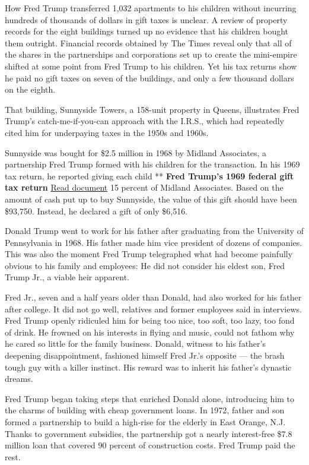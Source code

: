 How Fred Trump transferred 1,032 apartments to his children without
incurring hundreds of thousands of dollars in gift taxes is unclear. A
review of property records for the eight buildings turned up no evidence
that his children bought them outright. Financial records obtained by
The Times reveal only that all of the shares in the partnerships and
corporations set up to create the mini-empire shifted at some point from
Fred Trump to his children. Yet his tax returns show he paid no gift
taxes on seven of the buildings, and only a few thousand dollars on the
eighth.

That building, Sunnyside Towers, a 158-unit property in Queens,
illustrates Fred Trump's catch-me-if-you-can approach with the I.R.S.,
which had repeatedly cited him for underpaying taxes in the 1950s and
1960s.

Sunnyside was bought for \$2.5 million in 1968 by Midland Associates, a
partnership Fred Trump formed with his children for the transaction. In
his 1969 tax return, he reported giving each child ** \textbf{Fred
Trump's 1969 federal gift tax return}
\href{https://int.graylady3jvrrxbe.onion/data/documenthelper/210-fct-1969-federal-gift-tax/37760d2a7b28b983e8ce/optimized/full.pdf\#page=1}{Read
document} 15 percent of Midland Associates. Based on the amount of cash
put up to buy Sunnyside, the value of this gift should have been
\$93,750. Instead, he declared a gift of only \$6,516.

Donald Trump went to work for his father after graduating from the
University of Pennsylvania in 1968. His father made him vice president
of dozens of companies. This was also the moment Fred Trump telegraphed
what had become painfully obvious to his family and employees: He did
not consider his eldest son, Fred Trump Jr., a viable heir apparent.

Fred Jr., seven and a half years older than Donald, had also worked for
his father after college. It did not go well, relatives and former
employees said in interviews. Fred Trump openly ridiculed him for being
too nice, too soft, too lazy, too fond of drink. He frowned on his
interests in flying and music, could not fathom why he cared so little
for the family business. Donald, witness to his father's deepening
disappointment, fashioned himself Fred Jr.'s opposite --- the brash
tough guy with a killer instinct. His reward was to inherit his father's
dynastic dreams.

Fred Trump began taking steps that enriched Donald alone, introducing
him to the charms of building with cheap government loans. In 1972,
father and son formed a partnership to build a high-rise for the elderly
in East Orange, N.J. Thanks to government subsidies, the partnership got
a nearly interest-free \$7.8 million loan that covered 90 percent of
construction costs. Fred Trump paid the rest.

